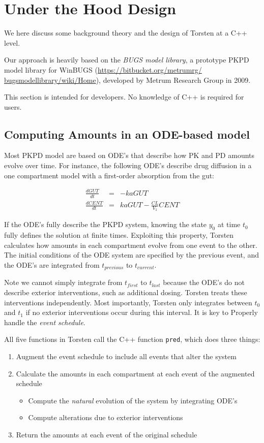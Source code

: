 \documentclass[11pt]{amsart}
\let\oldsection\section
\renewcommand\section{\clearpage\oldsection}
\begin{document}
\section{Under the Hood Design}
We here discuss some background theory and the design of Torsten at a C++ level.

Our approach is heavily based on the \textit{BUGS model library}, a prototype PKPD model library for WinBUGS (\url{https://bitbucket.org/metrumrg/ bugsmodellibrary/wiki/Home}), developed by Metrum Research Group in 2009.

This section is intended for developers. No knowledge of C++ is required for users.


\subsection*{Computing Amounts in an ODE-based model}
Most PKPD model are based on ODE's that describe how PK and PD amounts evolve over time. For instance, the following ODE's describe drug diffusion in a one compartment model with a first-order absorption from the gut:

\begin{eqnarray*}
\frac{dGUT}{dt} &=& -kaGUT \\ 
\frac{dCENT}{dt} &=& kaGUT - \frac{CL}{V_{1}}CENT
\end{eqnarray*}

If the ODE's fully describe the PKPD system, knowing the state $y_0$ at time $t_0$ fully defines the solution at finite times. Exploiting this property, Torsten calculates how amounts in each compartment evolve from one event to the other. The initial conditions of the ODE system are specified by the previous event, and the ODE's are integrated from $t_{previous} $ to $t_{current}$. 

Note we cannot simply integrate from $t_{first}$ to $t_{last}$ because the ODE's do not describe exterior interventions, such as additional dosing. Torsten treats these interventions independently. Most importantly, Torsten only integrates between $t_0$ and $t_1$ if no exterior interventions occur during this interval. It is key to Properly handle the \textit{event schedule}. 

All five functions in Torsten call the C++ function \texttt{pred}, which does three things:
\begin{enumerate}
  \item Augment the event schedule to include all events that alter the system
  \item Calculate the amounts in each compartment at each event of the augmented schedule
  \begin{itemize}
    \item Compute the \textit{natural} evolution of the system by integrating ODE's
    \item Compute alterations due to exterior interventions
  \end{itemize}
  \item Return the amounts at each event of the original schedule
\end{enumerate}
\end{document}
